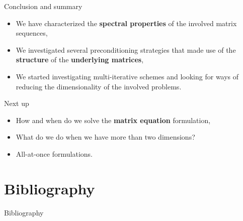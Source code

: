 \documentclass[aspectratio=169,xcolor=dvipsnames]{beamer}
\newcommand\unnumbered{\setbeamertemplate{footline}{}}%
\begin{document}
\begin{frame}{Conclusion and summary}
	
	\begin{itemize}
		\item[\textcolor{success}{\faCheckCircle}] We have characterized the \textbf{spectral properties} of the involved matrix sequences,
		\item[\textcolor{success}{\faCheckCircle}] We investigated several preconditioning strategies that made use of the \textbf{structure} of the \textbf{underlying matrices},
		\item[\textcolor{success}{\faCheckCircle}] We started investigating \alert{multi-iterative schemes} and looking for ways of reducing the dimensionality of the involved problems.
	\end{itemize}

	Next up
	\begin{itemize}
		\item[\textcolor{todo}{\faClipboardList}] How and when do we solve the \textbf{matrix equation} formulation,
		\item[\textcolor{todo}{\faClipboardList}] What do we do when we have more than two dimensions?
		\item[\textcolor{todo}{\faClipboardList}] All-at-once formulations.
	\end{itemize}
		
	\end{frame}

	\section*{Bibliography}
	{\unnumbered
		\begin{frame}{Bibliography}
			\small
			\printbibliography
			
		\end{frame}
	}
\end{document}
